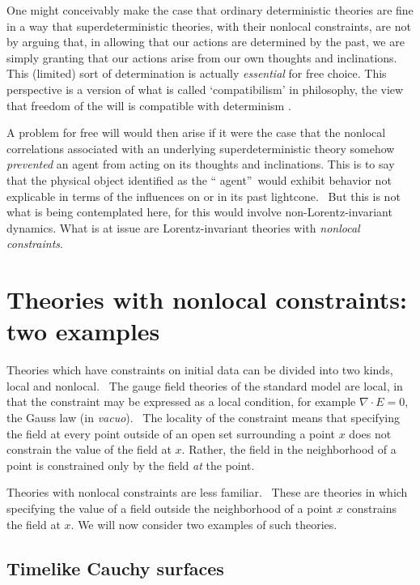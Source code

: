 \documentclass[12pt]{article}%
\begin{document}
One might conceivably make the case that ordinary deterministic theories are
fine in a way that superdeterministic theories, with their nonlocal
constraints, are not by arguing that, in allowing that our actions are
determined by the past, we are simply granting that our actions arise from our
own thoughts and inclinations. This (limited) sort of determination is
actually \emph{essential }for free choice. This perspective is a version of
what is called `compatibilism' in philosophy, the view that freedom of the
will is compatible with determinism \cite{Hume00}.

A problem for free will would then arise if it were the case that the nonlocal
correlations associated with an underlying superdeterministic theory somehow
\emph{prevented} an agent from acting on its thoughts and inclinations. This
is to say that the physical object identified as the \textquotedblleft
agent\textquotedblright\ would exhibit behavior not explicable in terms of the
influences on or in its past lightcone. \ But this is not what is being
contemplated here, for this would involve non-Lorentz-invariant dynamics. What
is at issue are Lorentz-invariant theories with \emph{nonlocal constraints}.

\section{Theories with nonlocal constraints: two examples}

Theories which have constraints on initial data can be divided into two kinds,
local and nonlocal. \ The gauge field theories of the standard model are
local, in that the constraint may be expressed as a local condition, for
example $\nabla\cdot E=0$, the Gauss law (in \emph{vacuo}). \ The locality of
the constraint means that specifying the field at every point outside of an
open set surrounding a point $x$ does not constrain the value of the field at
$x$. Rather, the field in the neighborhood of a point is constrained only by
the field \emph{at} the point.

Theories with nonlocal constraints are less familiar. \ These are theories in
which specifying the value of a field outside the neighborhood of a point $x$
constrains the field at $x$. We will now consider two examples of such theories.

\subsection{Timelike Cauchy surfaces}
\end{document}
